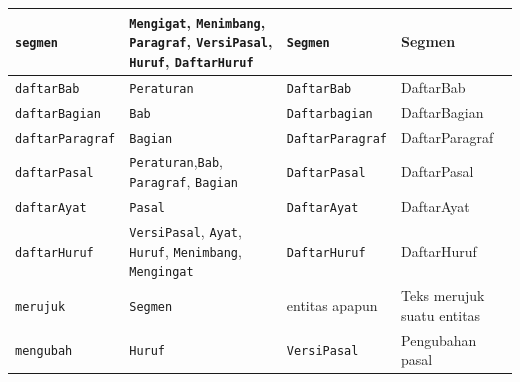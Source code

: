 \begin{longtable}{|p{}|p{}|p{}|p{}|}
  \texttt{segmen}          & \texttt{Mengigat}, \texttt{Menimbang}, \texttt{Paragraf}, \texttt{VersiPasal}, \texttt{Huruf}, \texttt{DaftarHuruf} & \texttt{Segmen}                                       & Segmen                                            \\ \hline
  \texttt{daftarBab}       & \texttt{Peraturan}                                                                                                  & \texttt{DaftarBab}                                    & DaftarBab                                         \\ \hline
  \texttt{daftarBagian}    & \texttt{Bab}                                                                                                        & \texttt{Daftarbagian}                                 & DaftarBagian                                      \\ \hline
  \texttt{daftarParagraf}  & \texttt{Bagian}                                                                                                     & \texttt{DaftarParagraf}                               & DaftarParagraf                                    \\ \hline
  \texttt{daftarPasal}     & \texttt{Peraturan},\texttt{Bab}, \texttt{Paragraf}, \texttt{Bagian}                                                 & \texttt{DaftarPasal}                                  & DaftarPasal                                       \\ \hline
  \texttt{daftarAyat}      & \texttt{Pasal}                                                                                                      & \texttt{DaftarAyat}                                   & DaftarAyat                                        \\ \hline
  \texttt{daftarHuruf}     & \texttt{VersiPasal}, \texttt{Ayat}, \texttt{Huruf}, \texttt{Menimbang}, \texttt{Mengingat}                          & \texttt{DaftarHuruf}                                  & DaftarHuruf                                       \\ \hline
  \texttt{merujuk}         & \texttt{Segmen}                                                                                                     & entitas apapun                                        & Teks merujuk suatu entitas                        \\ \hline
  \texttt{mengubah}        & \texttt{Huruf}                                                                                                      & \texttt{VersiPasal}                                   & Pengubahan pasal                                  \\ \hline

\end{longtable}
